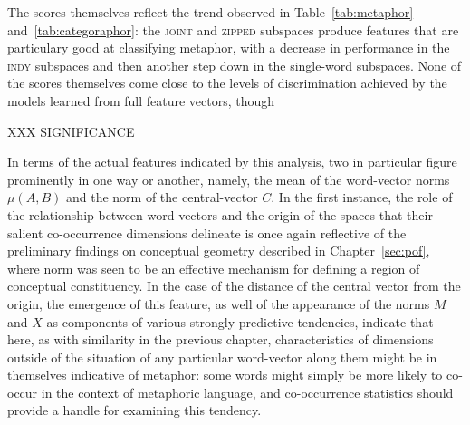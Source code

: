 
The scores themselves reflect the trend observed in Table~\ref{tab:metaphor} and~\ref{tab:categoraphor}: the \textsc{joint} and \textsc{zipped} subspaces produce features that are particulary good at classifying metaphor, with a decrease in performance in the \textsc{indy} subspaces and then another step down in the single-word subspaces.  None of the scores themselves come close to the levels of discrimination achieved by the models learned from full feature vectors, though

XXX SIGNIFICANCE

In terms of the actual features indicated by this analysis, two in particular figure prominently in one way or another, namely, the mean of the word-vector norms $\mu(A,B)$ and the norm of the central-vector $C$.  In the first instance, the role of the relationship between word-vectors and the origin of the spaces that their salient co-occurrence dimensions delineate is once again reflective of the preliminary findings on conceptual geometry described in Chapter~\ref{sec:pof}, where norm was seen to be an effective mechanism for defining a region of conceptual constituency.  In the case of the distance of the central vector from the origin, the emergence of this feature, as well of the appearance of the norms $M$ and $X$ as components of various strongly predictive tendencies, indicate that here, as with similarity in the previous chapter, characteristics of dimensions outside of the situation of any particular word-vector along them might be in themselves indicative of metaphor: some words might simply be more likely to co-occur in the context of metaphoric language, and co-occurrence statistics should provide a handle for examining this tendency.

